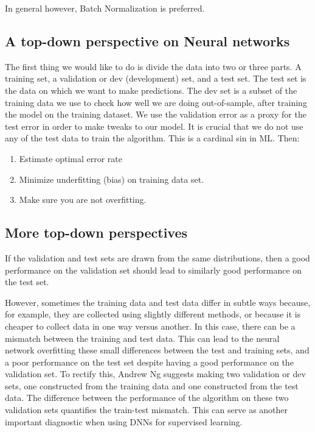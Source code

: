 \documentclass[%
oneside,                 %
final,                   %
10pt]{article}
\begin{document}
In general however, Batch
Normalization is preferred.

\subsection{A top-down perspective on Neural networks}

The first thing we would like to do is divide the data into two or
three parts. A training set, a validation or dev (development) set,
and a test set. The test set is the data on which we want to make
predictions. The dev set is a subset of the training data we use to
check how well we are doing out-of-sample, after training the model on
the training dataset. We use the validation error as a proxy for the
test error in order to make tweaks to our model. It is crucial that we
do not use any of the test data to train the algorithm. This is a
cardinal sin in ML. Then:

\begin{enumerate}
\item Estimate optimal error rate

\item Minimize underfitting (bias) on training data set.

\item Make sure you are not overfitting.
\end{enumerate}

\noindent
\subsection{More top-down perspectives}

If the validation and test sets are drawn from the same distributions,
then a good performance on the validation set should lead to similarly
good performance on the test set. 

However, sometimes
the training data and test data differ in subtle ways because, for
example, they are collected using slightly different methods, or
because it is cheaper to collect data in one way versus another. In
this case, there can be a mismatch between the training and test
data. This can lead to the neural network overfitting these small
differences between the test and training sets, and a poor performance
on the test set despite having a good performance on the validation
set. To rectify this, Andrew Ng suggests making two validation or dev
sets, one constructed from the training data and one constructed from
the test data. The difference between the performance of the algorithm
on these two validation sets quantifies the train-test mismatch. This
can serve as another important diagnostic when using DNNs for
supervised learning.
\end{document}
